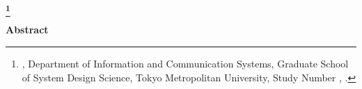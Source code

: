 \newpage
\begin{center}
 \renewcommand{\thefootnote}{\fnsymbol{footnote}}
 \Large\bfseries \etitle\footnote[1]
 {{\edoctitle}, Department of Information and Communication Systems,
 Graduate School of System Design \mbox{Science,}
 Tokyo Metropolitan University,
 {Study Number \studentnumber}, \edate.}
 \renewcommand{\thefootnote}{\arabic{footnote}}
\end{center}
\vspace*{1truemm}
\begin{center}
 \large\eauthor
\end{center}
\vspace*{2truemm}
\begin{center}
 {\bfseries Abstract}
\end{center}
\vspace*{2truemm}
\par
\eabstract

